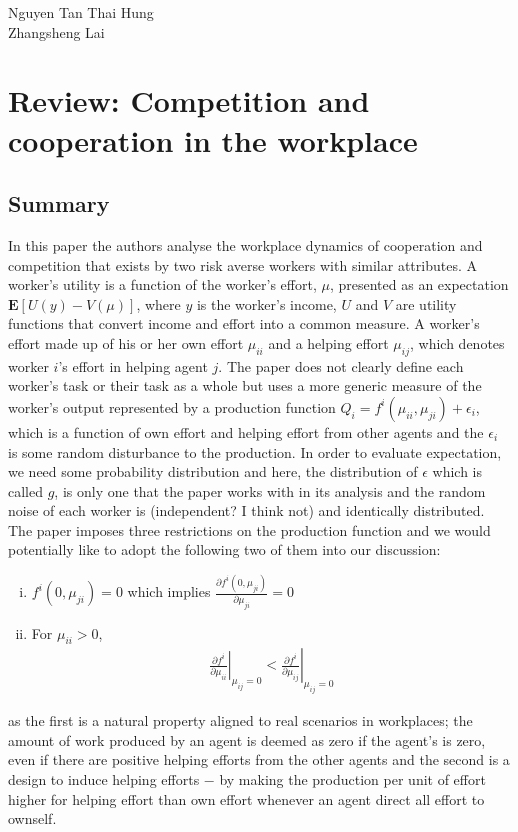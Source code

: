 \documentclass[a4paper,10pt,leqno]{article}
\theoremstyle{definition}
\begin{document}
\begin{flushright}
Nguyen Tan Thai Hung\\
Zhangsheng Lai\\
\end{flushright}
\section*{Review: Competition and cooperation in the
workplace}
\subsection*{Summary}

In this paper the authors analyse the workplace dynamics of cooperation and competition that exists by two risk averse workers with similar attributes. A worker's utility is a function of the worker's effort, $\mu$, presented as an expectation $\mathbf{E}[U(y)-V(\mu)]$,
where $y$ is the worker's income, $U$ and $V$ are utility functions that convert income and effort into a common measure. A worker's effort made up of his or her own effort $\mu_{ii}$ and a helping effort $\mu_{ij}$, which denotes worker $i$'s effort in helping agent $j$. The paper does not clearly define each worker's task or their task as a whole but uses a more generic measure of the worker's output represented by a production function $Q_i=f^i(\mu_{ii},\mu_{ji})+\epsilon_i$,
which is a function of own effort and helping effort from other agents and the $\epsilon_i$ is some random disturbance to the production. In order to evaluate expectation, we need some probability distribution and here, the distribution of $\epsilon$ which is called $g$, is only one that the paper works with in its analysis and the random noise of each worker is (independent? I think not) and identically distributed. The paper imposes three restrictions on the production function and we would potentially like to adopt the following two of them into our discussion: 
\begin{enumerate}[(i)]
\item $f^i(0,\mu_{ji})=0$ which implies $\frac{\partial f^i(0,\mu_{ji})}{\partial \mu_{ji}}=0$
\item For $\mu_{ii}>0$,
\begin{align*}
\left.\frac{\partial f^i}{\partial \mu_{ii}}\right|_{\mu_{ij}=0} < \left.\frac{\partial f^i}{\partial \mu_{ij}}\right|_{\mu_{ij}=0}
\end{align*}
\end{enumerate}
as the first is a natural property aligned to real scenarios in workplaces; the amount of work produced by an agent is deemed as zero if the agent's is zero, even if there are positive helping efforts from the other agents  and the second is a design to induce helping efforts $-$ by making the production per unit of effort higher for helping effort than own effort whenever an agent direct all effort to ownself.
\end{document}
